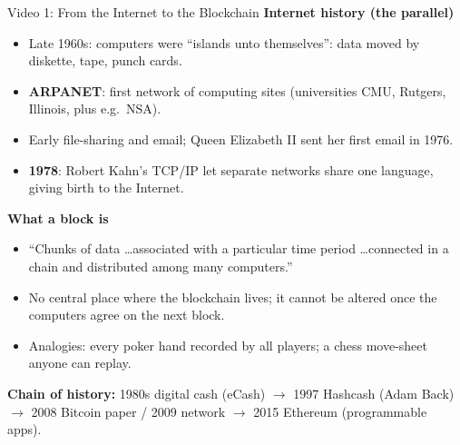 \documentclass[aspectratio=169,11pt]{beamer}
\begin{document}
\begin{frame}{Video 1: From the Internet to the Blockchain}
  \scriptsize
  \textbf{Internet history (the parallel)}
  \begin{itemize}
    \item Late 1960s: computers were ``islands unto themselves'': data moved by diskette, tape, punch cards.
    \item \textbf{ARPANET}: first network of computing sites (universities CMU, Rutgers, Illinois, plus e.g.\ NSA).
    \item Early file-sharing and email; Queen Elizabeth II sent her first email in 1976.
    \item \textbf{1978}: Robert Kahn's TCP/IP let separate networks share one language, giving birth to the Internet.
  \end{itemize}
  \textbf{What a block is}
  \begin{itemize}
    \item ``Chunks of data \ldots associated with a particular time period \ldots connected in a chain and distributed among many computers.''
    \item No central place where the blockchain lives; it cannot be altered once the computers agree on the next block.
    \item Analogies: every poker hand recorded by all players; a chess move-sheet anyone can replay.
  \end{itemize}
  \textbf{Chain of history:} 1980s digital cash (eCash) $\rightarrow$ 1997 Hashcash (Adam Back) $\rightarrow$ 2008 Bitcoin paper / 2009 network $\rightarrow$ 2015 Ethereum (programmable apps).
\end{frame}
\end{document}
